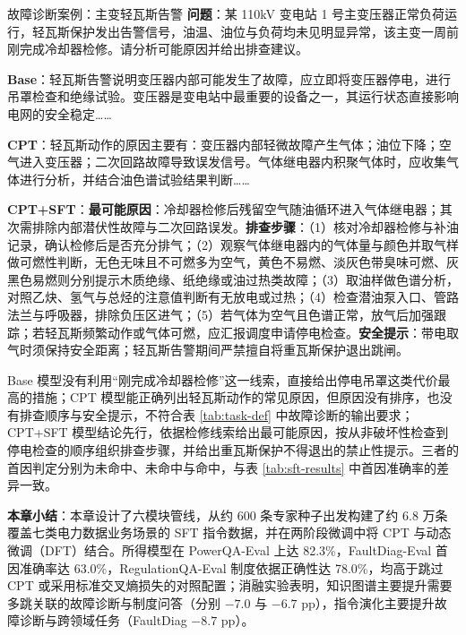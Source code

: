 \documentclass[fontset=fandol,type=master,campus=shenzhen,etitleauto=true]{hithesisbook}
\begin{document}
\begin{promptbox}{故障诊断案例：主变轻瓦斯告警}
\textbf{问题}：某 110kV 变电站 1 号主变压器正常负荷运行，轻瓦斯保护发出告警信号，油温、油位与负荷均未见明显异常，该主变一周前刚完成冷却器检修。请分析可能原因并给出排查建议。\par\smallskip
\textbf{Base}：轻瓦斯告警说明变压器内部可能发生了故障，应立即将变压器停电，进行吊罩检查和绝缘试验。变压器是变电站中最重要的设备之一，其运行状态直接影响电网的安全稳定……\par\smallskip
\textbf{CPT}：轻瓦斯动作的原因主要有：变压器内部轻微故障产生气体；油位下降；空气进入变压器；二次回路故障导致误发信号。气体继电器内积聚气体时，应收集气体进行分析，并结合油色谱试验结果判断……\par\smallskip
\textbf{CPT+SFT}：\textbf{最可能原因}：冷却器检修后残留空气随油循环进入气体继电器；其次需排除内部潜伏性故障与二次回路误发。\textbf{排查步骤}：（1）核对冷却器检修与补油记录，确认检修后是否充分排气；（2）观察气体继电器内的气体量与颜色并取气样做可燃性判断，无色无味且不可燃多为空气，黄色不易燃、淡灰色带臭味可燃、灰黑色易燃则分别提示木质绝缘、纸绝缘或油过热类故障；（3）取油样做色谱分析，对照乙炔、氢气与总烃的注意值判断有无放电或过热；（4）检查潜油泵入口、管路法兰与呼吸器，排除负压区进气；（5）若气体为空气且色谱正常，放气后加强跟踪；若轻瓦斯频繁动作或气体可燃，应汇报调度申请停电检查。\textbf{安全提示}：带电取气时须保持安全距离；轻瓦斯告警期间严禁擅自将重瓦斯保护退出跳闸。
\end{promptbox}

Base 模型没有利用“刚完成冷却器检修”这一线索，直接给出停电吊罩这类代价最高的措施；CPT 模型能正确列出轻瓦斯动作的常见原因，但原因没有排序，也没有排查顺序与安全提示，不符合表 \ref{tab:task-def} 中故障诊断的输出要求；CPT+SFT 模型结论先行，依据检修线索给出最可能原因，按从非破坏性检查到停电检查的顺序组织排查步骤，并给出重瓦斯保护不得退出的禁止性提示。三者的首因判定分别为未命中、未命中与命中，与表 \ref{tab:sft-results} 中首因准确率的差异一致。

\vspace{0.5cm}
\noindent \textbf{本章小结}：本章设计了六模块管线，从约 600 条专家种子出发构建了约 6.8 万条覆盖七类电力数据业务场景的 SFT 指令数据，并在两阶段微调中将 CPT 与动态微调（DFT）结合。所得模型在 PowerQA-Eval 上达 82.3\%，FaultDiag-Eval 首因准确率达 63.0\%，RegulationQA-Eval 制度依据正确性达 78.0\%，均高于跳过 CPT 或采用标准交叉熵损失的对照配置；消融实验表明，知识图谱主要提升需要多跳关联的故障诊断与制度问答（分别 $-7.0$ 与 $-6.7$ pp），指令演化主要提升故障诊断与跨领域任务（FaultDiag $-8.7$ pp）。
\end{document}
